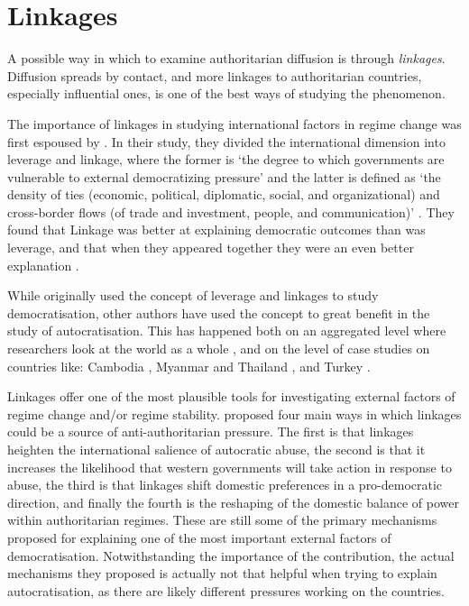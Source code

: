 \section{Linkages}
A possible way in which to examine authoritarian diffusion is through \textit{linkages}. Diffusion spreads by contact, and more linkages to authoritarian countries, especially influential ones, is one of the best ways of studying the phenomenon. 

The importance of linkages in studying international factors in regime change was first espoused by \citet{levitsky_linkage_2006}. In their study, they divided the international dimension into leverage and linkage, where the former is `the degree to which governments are vulnerable to external democratizing pressure' and the latter is defined as `the density of ties (economic, political, diplomatic, social, and organizational) and cross-border flows (of trade and investment, people, and communication)' \citep[p. 379]{levitsky_linkage_2006}. They found that Linkage was better at explaining democratic outcomes than was leverage, and that when they appeared together they were an even better explanation \citep[pp. 388]{levitsky_linkage_2006}.

While \citeauthor{levitsky_linkage_2006} originally used the concept of leverage and linkages to study democratisation, other authors have used the concept to great benefit in the study of autocratisation. This has happened both on an aggregated level where researchers look at the world as a whole \citep{ambrosio_constructing_2010, hall_authoritarian_2017, tansey_ties_2017}, and on the level of case studies on countries like: Cambodia \citep{loughlin_chinese_2021}, Myanmar and Thailand \citep{wong_chinese_2019}, and Turkey \citep{yilmaz_authoritarian_2020}. 

Linkages offer one of the most plausible tools for investigating external factors of regime change and/or regime stability. \citet[pp. 383-386]{levitsky_linkage_2006} proposed four main ways in which linkages could be a source of anti-authoritarian pressure. The first is that linkages heighten the international salience of autocratic abuse, the second is that it increases the likelihood that western governments will take action in response to abuse, the third is that linkages shift domestic preferences in a pro-democratic direction, and finally the fourth is the reshaping of the domestic balance of power within authoritarian regimes. These are still some of the primary mechanisms proposed for explaining one of the most important external factors of democratisation. Notwithstanding the importance of the contribution, the actual mechanisms they proposed is actually not that helpful when trying to explain autocratisation, as there are likely different pressures working on the countries. 

